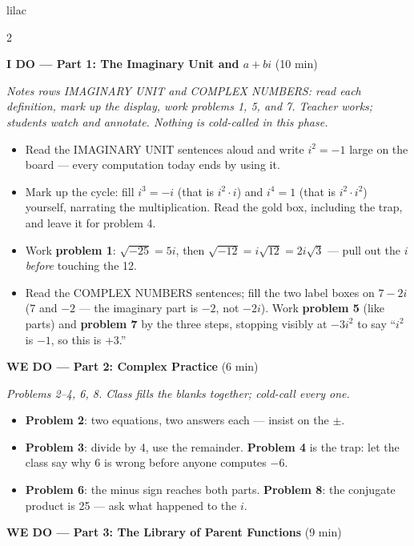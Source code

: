 \documentclass[10pt]{article}
\begin{document}
\begin{skillbox}{lilac}
\begin{multicols}{2}

\textbf{I DO --- Part 1: The Imaginary Unit and $a + bi$} (10 min)

\textit{Notes rows IMAGINARY UNIT and COMPLEX NUMBERS: read each definition, mark up the
display, work problems 1, 5, and 7. Teacher works; students watch and annotate. Nothing is
cold-called in this phase.}
\begin{itemize}
  \item Read the IMAGINARY UNIT sentences aloud and write $i^2 = -1$ large on the board ---
        every computation today ends by using it.
  \item Mark up the cycle: fill $i^3 = -i$ (that is $i^2 \cdot i$) and $i^4 = 1$ (that is
        $i^2 \cdot i^2$) yourself, narrating the multiplication. Read the gold box, including
        the trap, and leave it for problem 4.
  \item Work \textbf{problem 1}: $\sqrt{-25} = 5i$, then $\sqrt{-12} = i\sqrt{12} = 2i\sqrt{3}$
        --- pull out the $i$ \textit{before} touching the 12.
  \item Read the COMPLEX NUMBERS sentences; fill the two label boxes on $7 - 2i$ (7 and $-2$
        --- the imaginary part is $-2$, not $-2i$). Work \textbf{problem 5} (like parts) and
        \textbf{problem 7} by the three steps, stopping visibly at $-3i^2$ to say ``$i^2$ is
        $-1$, so this is $+3$.''
\end{itemize}

\textbf{WE DO --- Part 2: Complex Practice} (6 min)

\textit{Problems 2--4, 6, 8. Class fills the blanks together; cold-call every one.}
\begin{itemize}
  \item \textbf{Problem 2}: two equations, two answers each --- insist on the $\pm$.
  \item \textbf{Problem 3}: divide by 4, use the remainder. \textbf{Problem 4} is the trap:
        let the class say why 6 is wrong before anyone computes $-6$.
  \item \textbf{Problem 6}: the minus sign reaches both parts. \textbf{Problem 8}: the
        conjugate product is 25 --- ask what happened to the $i$.
\end{itemize}

\columnbreak

\textbf{WE DO --- Part 3: The Library of Parent Functions} (9 min)


\end{multicols}
\end{skillbox}
\end{document}
